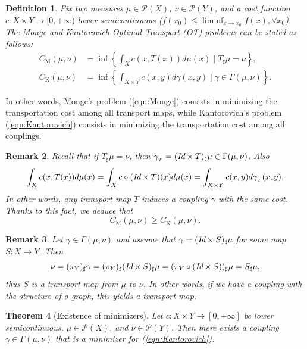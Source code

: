 \documentclass[11pt]{book}
\newtheorem{theorem}{Theorem}[section]
\newtheorem{definition}[theorem]{Definition}
\newtheorem{remark}[theorem]{Remark}
\begin{document}
\begin{definition}
Fix  two measures \(\mu \in \mathcal{P}(X)\), \(\nu \in \mathcal{P}(Y)\), and a cost function \(c: X \times Y \rightarrow [0, +\infty)\) lower semicontinuous ($f(x_0) \le \liminf_{x\to x_0} f(x), \forall x_0$). The Monge and Kantorovich Optimal Transport (OT) problems can be stated as follows:
\begin{align}
C_{\mathrm{M}}(\mu, \nu) &= \inf \left\{\int_X c(x, T(x))d\mu(x) \mid T_\sharp \mu = \nu \right\}, \tag{M} \label{eqn:Monge} \\
C_{\mathrm{K}}(\mu, \nu) &= \inf \left\{\int_{X \times Y} c(x, y)d\gamma(x, y) \mid \gamma \in \Gamma(\mu, \nu) \right\}. \tag{K} \label{eqn:Kantorovich}
\end{align}
\end{definition}
In other words, Monge's problem (\ref{eqn:Monge}) consists in minimizing the transportation cost among all transport maps, while Kantorovich's problem (\ref{eqn:Kantorovich}) consists in minimizing the transportation cost among all couplings.

\begin{remark}
Recall that if \(T_\sharp \mu = \nu\), then \(\gamma_{_T} = (\emph{Id} \times T)_\sharp \mu \in \Gamma(\mu, \nu)\). Also
\[
\int_X c(x, T(x))d\mu(x) = \int_X c \circ (\emph{Id} \times T)(x)d\mu(x) = \int_{X \times Y} c(x, y)d\gamma_{_T}(x, y).
\]
In other words, any transport map \(T\) induces a coupling \(\gamma\) with the same cost. Thanks to this fact, we deduce that
\[
C_{\text{M}}(\mu, \nu) \geq C_{\text{K}}(\mu, \nu).
\]
\end{remark}

\begin{remark}
Let \(\gamma \in \Gamma(\mu, \nu)\) and assume that \(\gamma = (\emph{Id} \times S)_\sharp \mu\) for some map \(S: X \rightarrow Y\). Then
\[
\nu = (\pi_Y)_\sharp \gamma = (\pi_Y)_\sharp(\emph{Id} \times S)_\sharp \mu = (\pi_Y \circ (\emph{Id} \times S))_\sharp \mu = S_\sharp \mu,
\]
thus \(S\) is a transport map from \(\mu\) to \(\nu\). In other words, if we have a coupling with the structure of a graph, this yields a transport map.
\end{remark}

\begin{theorem}[Existence of minimizers]
Let \( c: X \times Y \rightarrow [0, +\infty] \) be lower semicontinuous, \( \mu \in \mathcal{P}(X) \), and \( \nu \in \mathcal{P}(Y) \). Then there exists a coupling \( \gamma \in \Gamma(\mu, \nu) \) that is a minimizer for (\ref{eqn:Kantorovich}).
\end{theorem}
\end{document}
